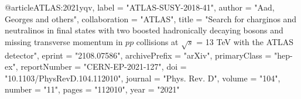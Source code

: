 @article{ATLAS:2021yqv,
    label = "ATLAS-SUSY-2018-41",
    author = "Aad, Georges and others",
    collaboration = "ATLAS",
    title = "{Search for charginos and neutralinos in final states with two boosted hadronically decaying bosons and missing transverse momentum in $pp$ collisions at $\sqrt {s}$ = 13\,\,TeV with the ATLAS detector}",
    eprint = "2108.07586",
    archivePrefix = "arXiv",
    primaryClass = "hep-ex",
    reportNumber = "CERN-EP-2021-127",
    doi = "10.1103/PhysRevD.104.112010",
    journal = "Phys. Rev. D",
    volume = "104",
    number = "11",
    pages = "112010",
    year = "2021"
}
